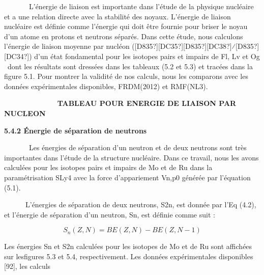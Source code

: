 \documentclass[a4paper]{article}
\begin{document}
\ \ \ \ \ \ \ L'énergie de liaison est importante dans l'étude de la physique nucléaire et a une relation directe avec
la stabilité des noyaux. L'énergie de liaison nucléaire est définie comme l'énergie qui doit être fournie pour briser
le noyau d'un atome en protons et neutrons séparés. Dans cette étude, nous calculons l'énergie de liaison moyenne par
nucléon ([D835?][DC35?][D835?][DC38?]⁄[D835?][DC34?]) d'un état fondamental pour les isotopes pairs et impairs de Fl,
Lv et Og \ dont les résultats sont dressées dans les tableaux (5.2 et 5.3) et tracées dans la figure 5.1. Pour montrer
la validité de nos calculs, nous les comparons avec les données expérimentales disponibles, FRDM(2012) et RMF(NL3).


\bigskip


\bigskip

\textbf{\ \ \ \ \ \ \ \ \ \ \ \ \ TABLEAU POUR ENERGIE DE LIAISON PAR NUCLEON}


\bigskip


\bigskip


\bigskip


\bigskip


\bigskip


\bigskip


\bigskip


\bigskip

\textbf{5.4.2 Énergie de séparation de neutrons}


\bigskip

\ \ \ \ \ \ \ Les énergies de séparation d’un neutron et de deux neutrons sont très importantes dans l’étude de la
structure nucléaire. Dans ce travail, nous les avons calculées pour les isotopes pairs et impairs de Mo et de Ru dans
la paramétrisation SLy4 avec la force d’appariement Vn,p0 générée par l’équation (5.1).

\ \ \ \ \ \ L’énergies de séparation de deux neutrons, S2n, est donnée par l’Eq (4.2), et l’énergie de séparation d’un
neutron, Sn, est définie comme suit :


\bigskip


\bigskip

\begin{equation*}
S_n\left(Z,N\right)=\mathit{BE}\left(Z,N\right)-\mathit{BE}(Z,N-1)
\end{equation*}

\bigskip


\bigskip

Les énergies Sn et S2n calculées pour les isotopes de Mo et de Ru sont affichées sur lesfigures 5.3 et 5.4,
respectivement. Les données expérimentales disponibles [92], les calculs
\end{document}
